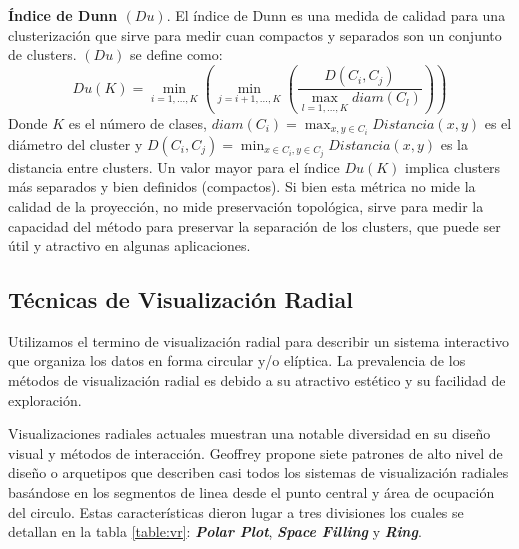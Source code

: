 \textbf{Índice de Dunn $(Du)$}. El índice de Dunn \cite{xu2009clustering} es una medida de calidad para una clusterización que sirve para medir cuan compactos y separados son un conjunto de clusters. $(Du)$ se define como:
\begin{equation}
Du(K)=\min_{i=1,\ldots,K}\left(\min_{j=i+1,\ldots,K}\left(\frac{D(C_i,C_j)}{\max_{l=1,\ldots,K}diam(C_l)}\right)\right)
\end{equation} 
Donde $K$ es el número de clases, $diam(C_i)=\max_{x,y\in C_i}Distancia(x,y)$ es el diámetro del cluster y $D(C_i,C_j)=\min_{x\in C_{i},y\in C_{j}}Distancia(x,y)$ es la distancia entre clusters.
Un valor mayor para el índice $Du(K)$ implica clusters más separados y bien definidos (compactos). Si bien esta métrica no mide la calidad de la proyección, no mide preservación topológica, sirve para medir la capacidad del método para preservar la separación de los clusters, que puede ser útil y atractivo en algunas aplicaciones. 

\subsection{Técnicas de Visualización Radial}
Utilizamos el termino de visualización radial para describir un sistema interactivo que organiza los datos en forma circular y/o elíptica. La prevalencia de los métodos de visualización radial es debido a su atractivo estético y su facilidad de exploración.

Visualizaciones radiales actuales muestran una notable diversidad en su diseño visual y métodos de interacción. Geoffrey \cite{draper2009survey} propone siete patrones de alto nivel de diseño o arquetipos que describen casi todos los sistemas de visualización radiales basándose en los segmentos de linea desde el punto central y área de ocupación del circulo. Estas características dieron lugar a tres divisiones los cuales se detallan en la tabla \ref{table:vr}: \textbf{\textit{Polar Plot}}, \textbf{\textit{Space Filling}} y \textbf{\textit{Ring}}.

